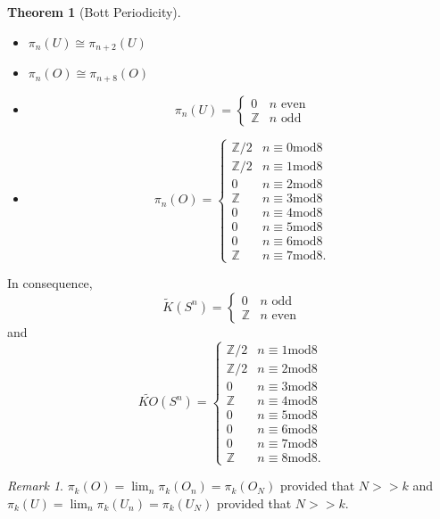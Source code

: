 \documentclass[a4paper,10pt]{article}
\theoremstyle{plain}%
\newtheorem{thm}{Theorem}
\theoremstyle{definition}
\theoremstyle{remark}
\newtheorem{rem}{Remark}
\newcommand{\ZZ}{\mathbb{Z}}
\begin{document}
\begin{thm}[Bott Periodicity]
\begin{itemize}
\item $\pi_n(U) \cong \pi_{n+2}(U)$
\item $\pi_n(O) \cong \pi_{n+8}(O)$
\item \[ \pi_n(U) = \begin{cases} 0 & n\text{ even}\\
\ZZ & n\text{ odd}
\end{cases}
\]
\item \[ \pi_n(O) = 
\begin{cases} 
\ZZ / 2 & n\equiv 0\text{mod}8\\
\ZZ / 2 & n\equiv 1\text{mod}8\\
0       & n\equiv 2\text{mod}8\\
\ZZ     & n\equiv 3\text{mod}8\\
0       & n\equiv 4\text{mod}8\\
0       & n\equiv 5\text{mod}8\\
0       & n\equiv 6\text{mod}8\\
\ZZ     & n\equiv 7\text{mod}8.
\end{cases}
\]
\end{itemize}
\end{thm}

In consequence,
\[ \tilde{K}(S^n) = \begin{cases} 0 & n\text{ odd}\\
\ZZ & n\text{ even}
\end{cases}
\]
and \[ \tilde{KO}(S^n) = 
\begin{cases} 
\ZZ / 2 & n\equiv 1\text{mod}8\\
\ZZ / 2 & n\equiv 2\text{mod}8\\
0       & n\equiv 3\text{mod}8\\
\ZZ     & n\equiv 4\text{mod}8\\
0       & n\equiv 5\text{mod}8\\
0       & n\equiv 6\text{mod}8\\
0       & n\equiv 7\text{mod}8\\
\ZZ     & n\equiv 8\text{mod}8.
\end{cases}
\]

\begin{rem}
$\pi_k(O) =\lim_n\pi_k(O_n)=\pi_k(O_N)$ provided that $N>>k$ and 
$\pi_k(U) =\lim_n\pi_k(U_n)=\pi_k(U_N)$ provided that $N>>k.$
\end{rem}
\end{document}
